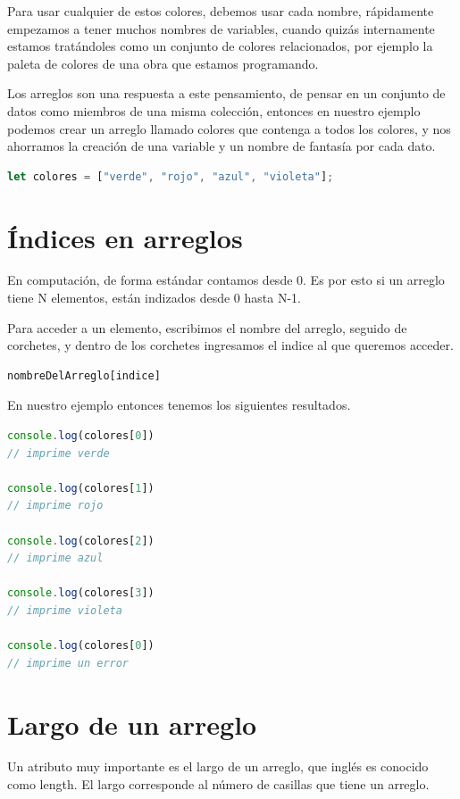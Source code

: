 \documentclass[../principal.tex]{subfiles}
\begin{document}
Para usar cualquier de estos colores, debemos usar cada nombre, rápidamente empezamos a tener muchos nombres de variables, cuando quizás internamente estamos tratándoles como un conjunto de colores relacionados, por ejemplo la paleta de colores de una obra que estamos programando.

Los arreglos son una respuesta a este pensamiento, de pensar en un conjunto de datos como miembros de una misma colección, entonces en nuestro ejemplo podemos crear un arreglo llamado colores que contenga a todos los colores, y nos ahorramos la creación de una variable y un nombre de fantasía por cada dato.

\begin{lstlisting}[language=JavaScript]
let colores = ["verde", "rojo", "azul", "violeta"];
\end{lstlisting}

\section{Índices en arreglos}

En computación, de forma estándar contamos desde 0. Es por esto si un arreglo tiene N elementos, están indizados desde 0 hasta N-1.

Para acceder a un elemento, escribimos el nombre del arreglo, seguido de corchetes, y dentro de los corchetes ingresamos el indice al que queremos acceder.

\begin{lstlisting}[language=JavaScript]
    nombreDelArreglo[indice]
\end{lstlisting}


En nuestro ejemplo entonces tenemos los siguientes resultados.

\begin{lstlisting}[language=JavaScript]
console.log(colores[0])
// imprime verde

console.log(colores[1])
// imprime rojo

console.log(colores[2])
// imprime azul

console.log(colores[3])
// imprime violeta

console.log(colores[0])
// imprime un error
\end{lstlisting}

\section{Largo de un arreglo}

Un atributo muy importante es el largo de un arreglo, que inglés es conocido como length. El largo corresponde al número de casillas que tiene un arreglo.
\end{document}
